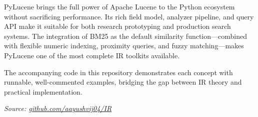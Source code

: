 \documentclass[11pt,a4paper]{article}
\begin{document}
PyLucene brings the full power of Apache Lucene to the Python ecosystem without
sacrificing performance. Its rich field model, analyzer pipeline, and query API
make it suitable for both research prototyping and production search systems.
The integration of BM25 as the default similarity function—combined with
flexible numeric indexing, proximity queries, and fuzzy matching—makes PyLucene
one of the most complete IR toolkits available.

The accompanying code in this repository demonstrates each concept with
runnable, well-commented examples, bridging the gap between IR theory and
practical implementation.

\vspace{1em}
\begin{center}
  \small\textit{Source: \href{https://github.com/aayushvij04/IR}{github.com/aayushvij04/IR}}
\end{center}
\end{document}
